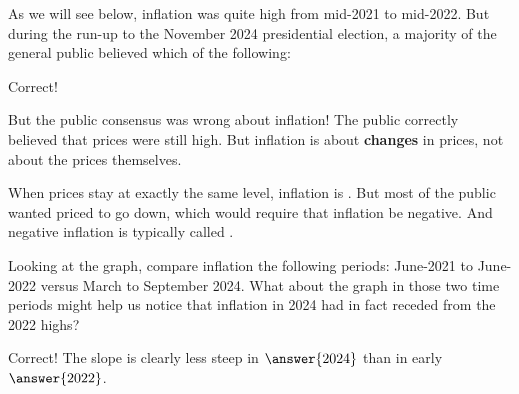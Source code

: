 \documentclass{ximera}
\begin{document}
\begin{question}
As we will see below, inflation was quite high from mid-2021 to mid-2022.  But during the run-up to the November 2024 presidential election, a majority of the general public believed which of the following: 
\begin{multipleChoice}
\end{multipleChoice}

\begin{question}
Correct!  

But the public consensus was wrong about inflation!  The public correctly believed that prices were still high.  But inflation is about \textbf{changes} in prices, not about the prices themselves. 

When prices stay at exactly the same level, inflation is .  But most of the public wanted priced to go down, which would require that inflation be negative.  And negative inflation is typically called .

Looking at the graph, compare inflation the following periods:  June-2021 to June-2022 versus March to September 2024. What about the graph in those two time periods might help us notice that inflation in 2024 had in fact receded from the 2022 highs?  
\begin{multipleChoice}
\end{multipleChoice}
\begin{question}
Correct!  The slope is clearly less steep in $\answer{2024}$ than in early $\answer{2022}$. 
\end{question}
\end{question}
\end{question}
\end{document}
